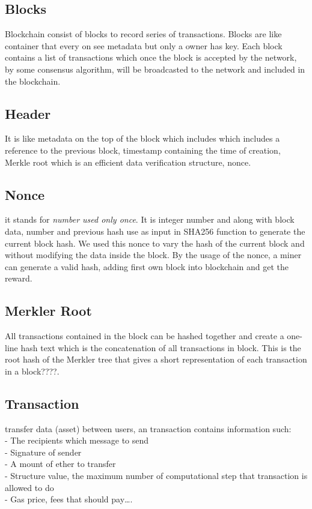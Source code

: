 \subsection{Blocks} Blockchain consist of blocks to record series of transactions. Blocks are like container that every on see metadata but only a owner has key. Each block contains a list of transactions which once the block is accepted by the network, by some consensus algorithm, will be broadcasted to the network and included in the blockchain\cite{Egbertseng}. 

\subsection{Header} It is like metadata on the top of the block which includes which includes a reference to the previous block, timestamp containing the time of creation, Merkle root which is an efficient data verification structure, nonce\cite{Kevin}.
\subsection{Nonce} it stands for \textit{number used only once}. It is integer number and along with block data, number and previous hash use as input in SHA256 function to generate the current block hash. We used this nonce to vary the hash of the current block and without modifying the data inside the block. By the usage of the nonce, a miner can generate a valid hash, adding first own block into blockchain and get the reward\cite{Gavin}.
\subsection{Merkler Root}
All transactions contained in the block can be hashed together and create a one-line hash text which is the concatenation of all transactions in block. This is the root hash of the Merkler tree that gives a short representation of each transaction in a block????.

\subsection{Transaction} transfer data (asset) between users, an transaction contains information such:\\
- The recipients which message to send\\
- Signature of sender \\
- A mount of ether to transfer\\
- Structure value, the maximum number of computational step that transaction is allowed to do \\
- Gas price, fees that should pay…\cite{Egbertsen}.\\

